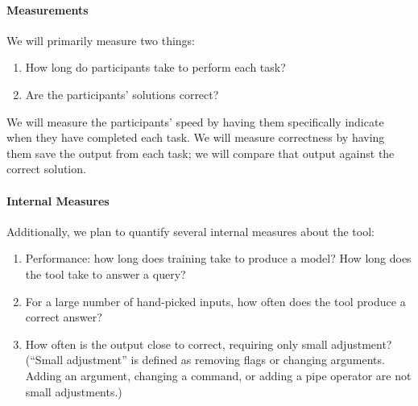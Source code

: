 \paragraph{Measurements} We will primarily measure two things:
\begin{enumerate}\itemsep-1pt
    \item How long do participants take to perform each task?
    \item Are the participants' solutions correct?
\end{enumerate}
We will measure the participants' speed by having them specifically indicate
when they have completed each task. We will measure correctness by having them
save the output from each task; we will compare that output against the correct
solution.

\paragraph{Internal Measures} Additionally, we plan to quantify several internal
measures about the tool:
\begin{enumerate}\itemsep-1pt
    \item Performance: how long does training take to produce a model? How
        long does the tool take to answer a query?
    \item For a large number of hand-picked inputs, how often does the
        tool produce a correct answer?
    \item How often is the output close to correct, requiring only small
        adjustment? (``Small adjustment'' is defined as removing flags or
        changing arguments. Adding an argument, changing a command, or
        adding a pipe operator are not small adjustments.)
\end{enumerate}
